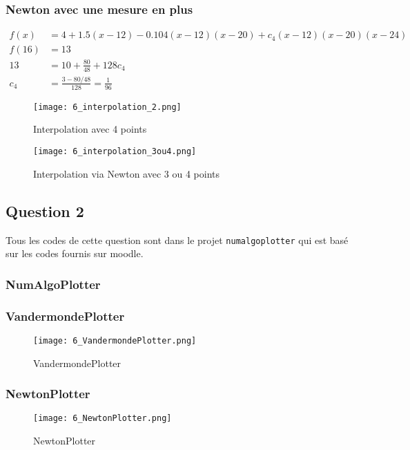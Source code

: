 \subsubsection{Newton avec une mesure en plus}

\begin{equation}
	\begin{aligned}
		f(x) &= 4 + 1.5(x-12) - 0.104(x-12)(x-20) + c_4(x-12)(x-20)(x-24)\\
		f(16) &= 13\\
		13 &= 10 + \frac{80}{48}+128c_4\\
		c_4 &= \frac{3-80/48}{128} = \frac{1}{96}
	\end{aligned}
\end{equation}

\begin{figure}[H]
	\centering
	\caption{\label{4pts} Interpolation avec 4 points}
	\texttt{[image: 6\_interpolation\_2.png]}
\end{figure}

\begin{figure}[H]
	\centering
	\caption{\label{3ou4} Interpolation via Newton avec 3 ou 4 points}
	\texttt{[image: 6\_interpolation\_3ou4.png]}
\end{figure}


\subsection{Question 2}

Tous les codes de cette question sont dans le projet \texttt{numalgoplotter} qui est basé sur les codes fournis sur moodle. 

\subsubsection{NumAlgoPlotter}

\subsubsection{VandermondePlotter}

\begin{figure}[H]
	\centering
	\caption{\label{vandermonde} VandermondePlotter}
	\texttt{[image: 6\_VandermondePlotter.png]}
\end{figure}

\subsubsection{NewtonPlotter}

\begin{figure}[H]
	\centering
	\caption{\label{newton} NewtonPlotter}
	\texttt{[image: 6\_NewtonPlotter.png]}
\end{figure}